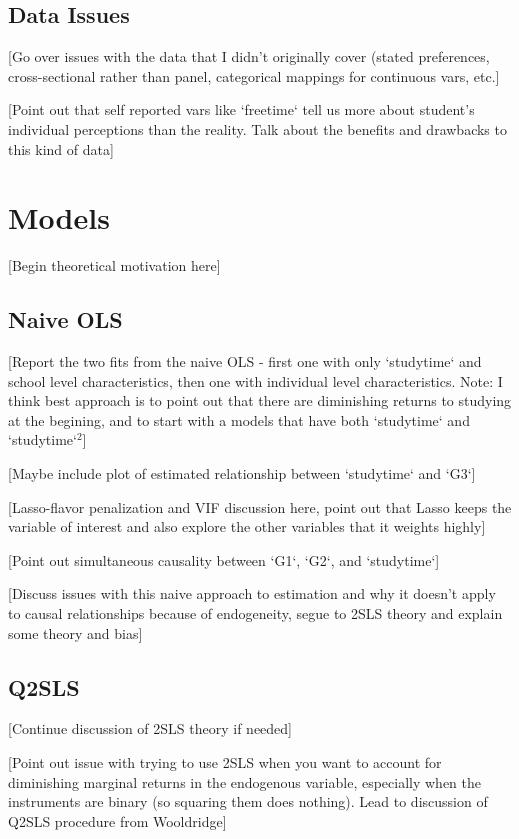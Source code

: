 \documentclass[12pt]{article}
\begin{document}
\subsection{Data Issues}
\textcolor{BrickRed}{[Go over issues with the data that I didn't originally cover (stated preferences, cross-sectional rather than panel, categorical mappings for continuous vars, etc.]}

\textcolor{BrickRed}{[Point out that self reported vars like `freetime` tell us more about student's individual perceptions than the reality. Talk about the benefits and drawbacks to this kind of data]}


\newpage
\section{Models}
\textcolor{BrickRed}{[Begin theoretical motivation here]}

\subsection{Naive OLS}
\textcolor{BrickRed}{[Report the two fits from the naive OLS - first one with only `studytime` and school level characteristics, then one with individual level characteristics. Note: I think best approach is to point out that there are diminishing returns to studying at the begining, and to start with a models that have both `studytime` and `studytime`$^2$]}

\textcolor{BrickRed}{[Maybe include plot of estimated relationship between `studytime` and `G3`]}

\textcolor{BrickRed}{[Lasso-flavor penalization and VIF discussion here, point out that Lasso keeps the variable of interest and also explore the other variables that it weights highly]}

\textcolor{BrickRed}{[Point out simultaneous causality between `G1`, `G2`, and `studytime`]}

\textcolor{BrickRed}{[Discuss issues with this naive approach to estimation and why it doesn't apply to causal relationships because of endogeneity, segue to 2SLS theory and explain some theory and bias]}

\subsection{Q2SLS}
\textcolor{BrickRed}{[Continue discussion of 2SLS theory if needed]}

\textcolor{BrickRed}{[Point out issue with trying to use 2SLS when you want to account for diminishing marginal returns in the endogenous variable, especially when the instruments are binary (so squaring them does nothing). Lead to discussion of Q2SLS procedure from Wooldridge]}
\end{document}
